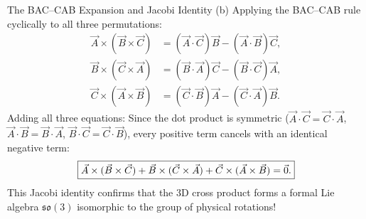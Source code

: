 \begin{workedexample}{The BAC--CAB Expansion and Jacobi Identity}
(b) Applying the BAC--CAB rule cyclically to all three permutations:
\begin{align*}
\vec{A}\times(\vec{B}\times\vec{C}) &= (\vec{A}\cdot\vec{C})\vec{B} - (\vec{A}\cdot\vec{B})\vec{C}, \\
\vec{B}\times(\vec{C}\times\vec{A}) &= (\vec{B}\cdot\vec{A})\vec{C} - (\vec{B}\cdot\vec{C})\vec{A}, \\
\vec{C}\times(\vec{A}\times\vec{B}) &= (\vec{C}\cdot\vec{B})\vec{A} - (\vec{C}\cdot\vec{A})\vec{B}.
\end{align*}
Adding all three equations:
Since the dot product is symmetric ($\vec{A}\cdot\vec{C} = \vec{C}\cdot\vec{A}$, $\vec{A}\cdot\vec{B} = \vec{B}\cdot\vec{A}$, $\vec{B}\cdot\vec{C} = \vec{C}\cdot\vec{B}$), every positive term cancels with an identical negative term:
\[
\boxed{\vec{A}\times(\vec{B}\times\vec{C}) + \vec{B}\times(\vec{C}\times\vec{A}) + \vec{C}\times(\vec{A}\times\vec{B}) = \vec{0}.}
\]
This Jacobi identity confirms that the 3D cross product forms a formal Lie algebra $\mathfrak{so}(3)$ isomorphic to the group of physical rotations!
\end{workedexample}

